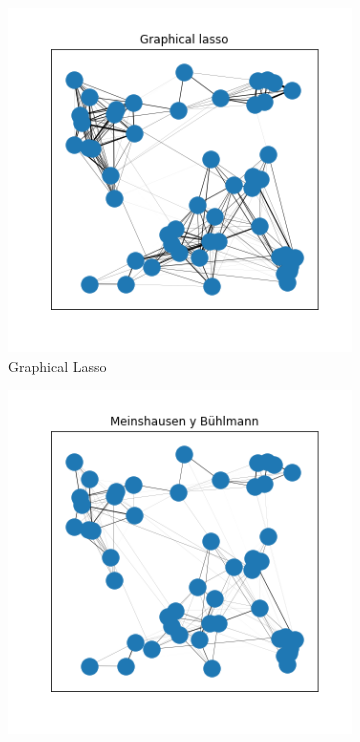 \documentclass{article}
\begin{document}
\begin{figure}[htb]
\begin{subfigure}[t]{0.24\linewidth}
        \includegraphics[width=\textwidth]{imagenes/generated_graph_syntetic/graphical_lasso.png}
        \caption{Graphical Lasso}
    \end{subfigure}\hfill
    \begin{subfigure}[t]{0.24\linewidth}
        \centering
        \includegraphics[width=\textwidth]{imagenes/generated_graph_syntetic/meinshausen_buhlmann.png}

\end{subfigure}
\end{figure}
\end{document}
